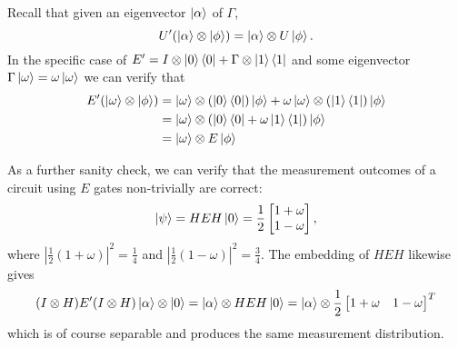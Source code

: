 \documentclass{article}
\theoremstyle{definition}
\theoremstyle{theorem}
\theoremstyle{remark}
\begin{document}
Recall that given an eigenvector $\ket{\alpha}$ of $\Gamma$,
\[
	U'(\ket{\alpha}\otimes \ket{\phi}) = \ket{\alpha}\otimes U\ket{\phi}.
\]
In the specific case of $E'=I\otimes \ket{0}\bra{0} + \Gamma\otimes \ket{1}\bra{1}$ and some eigenvector $\Gamma\ket{\omega} = \omega\ket{\omega}$ we can verify that
\begin{align*}
	E'(\ket{\omega}\otimes \ket{\phi})
		&= \ket{\omega} \otimes (\ket{0}\bra{0})\ket{\phi} + \omega\ket{\omega}\otimes (\ket{1}\bra{1})\ket{\phi} \\
		&=\ket{\omega}\otimes (\ket{0}\bra{0} + \omega\ket{1}\bra{1})\ket{\phi} \\
		&=\ket{\omega}\otimes E\ket{\phi}
\end{align*}

As a further sanity check, we can verify that the measurement outcomes of a circuit using $E$ gates non-trivially are correct:
\[
	\ket{\psi} = HEH\ket{0} = \frac{1}{2}\begin{bmatrix} 1 + \omega \\ 1 - \omega \end{bmatrix},
\]
where $|\frac{1}{2}(1 + \omega)|^2 = \frac{1}{4}$ and $|\frac{1}{2}(1 - \omega)|^2 = \frac{3}{4}$. The embedding of $HEH$ likewise gives
\[
	(I\otimes H)E'(I\otimes H)\ket{\alpha}\otimes\ket{0} 
		= \ket{\alpha}\otimes HEH\ket{0} 
		= \ket{\alpha} \otimes \frac{1}{2}\begin{bmatrix} 1 + \omega & 1 - \omega \end{bmatrix}^T
\]
which is of course separable and produces the same measurement distribution.
\end{document}
